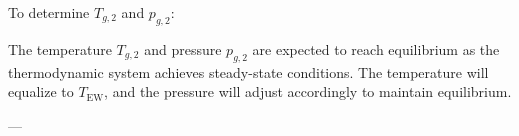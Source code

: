 To determine \( T_{g,2} \) and \( p_{g,2} \):  

The temperature \( T_{g,2} \) and pressure \( p_{g,2} \) are expected to reach equilibrium as the thermodynamic system achieves steady-state conditions. The temperature will equalize to \( T_{\text{EW}} \), and the pressure will adjust accordingly to maintain equilibrium.  

---